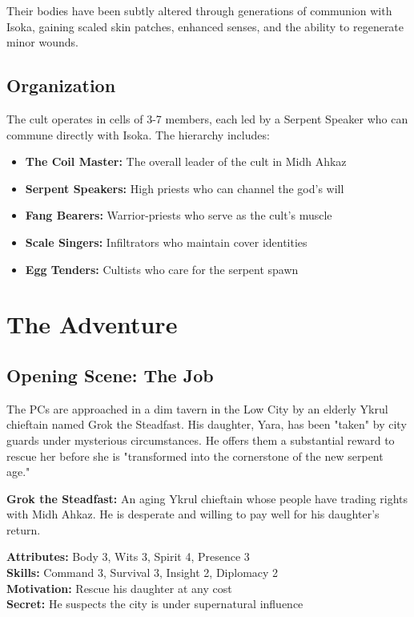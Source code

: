 \documentclass[12pt,twoside]{article}
\begin{document}
Their bodies have been subtly altered through generations of communion with Isoka, gaining scaled skin patches, enhanced senses, and the ability to regenerate minor wounds.

\subsection{Organization}

The cult operates in cells of 3-7 members, each led by a Serpent Speaker who can commune directly with Isoka. The hierarchy includes:
\begin{itemize}
  \item \textbf{The Coil Master:} The overall leader of the cult in Midh Ahkaz
  \item \textbf{Serpent Speakers:} High priests who can channel the god's will
  \item \textbf{Fang Bearers:} Warrior-priests who serve as the cult's muscle
  \item \textbf{Scale Singers:} Infiltrators who maintain cover identities
  \item \textbf{Egg Tenders:} Cultists who care for the serpent spawn
\end{itemize}

\section{The Adventure}

\subsection{Opening Scene: The Job}

The PCs are approached in a dim tavern in the Low City by an elderly Ykrul chieftain named Grok the Steadfast. His daughter, Yara, has been "taken" by city guards under mysterious circumstances. He offers them a substantial reward to rescue her before she is "transformed into the cornerstone of the new serpent age."

\textbf{Grok the Steadfast:}
An aging Ykrul chieftain whose people have trading rights with Midh Ahkaz. He is desperate and willing to pay well for his daughter's return.

\textbf{Attributes:} Body 3, Wits 3, Spirit 4, Presence 3 \\
\textbf{Skills:} Command 3, Survival 3, Insight 2, Diplomacy 2 \\
\textbf{Motivation:} Rescue his daughter at any cost \\
\textbf{Secret:} He suspects the city is under supernatural influence
\end{document}
